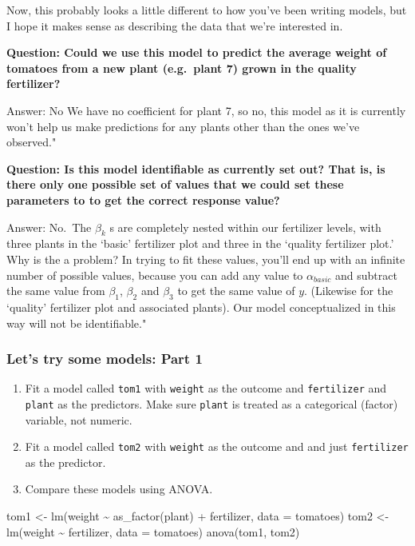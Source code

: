 \documentclass[
  openany]{book}
\newenvironment{Shaded}{\begin{snugshade}}{\end{snugshade}}
\newcommand{\AttributeTok}[1]{\textcolor[rgb]{0.77,0.63,0.00}{#1}}
\newcommand{\FunctionTok}[1]{\textcolor[rgb]{0.00,0.00,0.00}{#1}}
\newcommand{\NormalTok}[1]{#1}
\newcommand{\OtherTok}[1]{\textcolor[rgb]{0.56,0.35,0.01}{#1}}
\newcommand{\SpecialCharTok}[1]{\textcolor[rgb]{0.00,0.00,0.00}{#1}}
\providecommand{\tightlist}{%
  \setlength{\itemsep}{0pt}\setlength{\parskip}{0pt}}
\begin{document}
Now, this probably looks a little different to how you've been writing models, but I hope it makes sense as describing the data that we're interested in.

\textbf{Question: Could we use this model to predict the average weight of tomatoes from a new plant (e.g.~plant 7) grown in the quality fertilizer?}

Answer: No We have no coefficient for plant 7, so no, this model as it is currently won't help us make predictions for any plants other than the ones we've observed."

\textbf{Question: Is this model identifiable as currently set out? That is, is there only one possible set of values that we could set these parameters to to get the correct response value?}

Answer: No.~The \(\beta_k\) s are completely nested within our fertilizer levels, with three plants in the `basic' fertilizer plot and three in the `quality fertilizer plot.' Why is the a problem? In trying to fit these values, you'll end up with an infinite number of possible values, because you can add any value to \(\alpha_{basic}\) and subtract the same value from \(\beta_1\), \(\beta_2\) and \(\beta_3\) to get the same value of \(y\). (Likewise for the `quality' fertilizer plot and associated plants). Our model conceptualized in this way will not be identifiable."

\hypertarget{lets-try-some-models-part-1}{%
\subsubsection{Let's try some models: Part 1}\label{lets-try-some-models-part-1}}

\begin{enumerate}
\def\labelenumi{\arabic{enumi}.}
\tightlist
\item
  Fit a model called \texttt{tom1} with \texttt{weight} as the outcome and \texttt{fertilizer} and \texttt{plant} as the predictors. Make sure \texttt{plant} is treated as a categorical (factor) variable, not numeric.
\item
  Fit a model called \texttt{tom2} with \texttt{weight} as the outcome and and just \texttt{fertilizer} as the predictor.
\item
  Compare these models using ANOVA.
\end{enumerate}

\begin{Shaded}
\begin{Highlighting}[]
\NormalTok{tom1 }\OtherTok{\textless{}{-}} \FunctionTok{lm}\NormalTok{(weight }\SpecialCharTok{\textasciitilde{}} \FunctionTok{as\_factor}\NormalTok{(plant) }\SpecialCharTok{+}\NormalTok{ fertilizer, }\AttributeTok{data =}\NormalTok{ tomatoes)}
\NormalTok{tom2 }\OtherTok{\textless{}{-}} \FunctionTok{lm}\NormalTok{(weight }\SpecialCharTok{\textasciitilde{}}\NormalTok{ fertilizer, }\AttributeTok{data =}\NormalTok{ tomatoes)}
\FunctionTok{anova}\NormalTok{(tom1, tom2)}
\end{Highlighting}
\end{Shaded}
\end{document}
